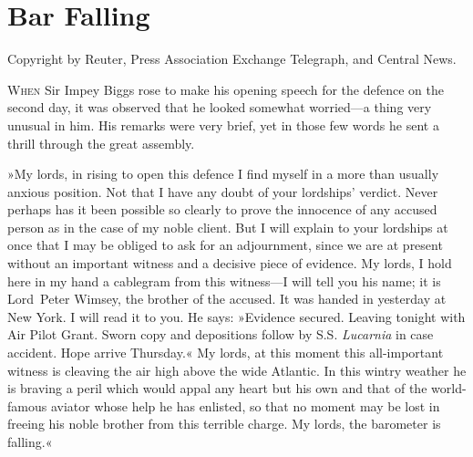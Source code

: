 
\chapter{Bar Falling}

\epigraph{Copyright by Reuter, Press Association Exchange Telegraph, and Central News.}{}


\lettrine[lines=4]{W}{hen} Sir Impey Biggs rose to make his opening speech for the defence on the second day, it was observed that he looked somewhat worried—a thing very unusual in him. His remarks were very brief, yet in those few words he sent a thrill through the great assembly.

»My lords, in rising to open this defence I find myself in a more than usually anxious position. Not that I have any doubt of your lordships' verdict. Never perhaps has it been possible so clearly to prove the innocence of any accused person as in the case of my noble client. But I will explain to your lordships at once that I may be obliged to ask for an adjournment, since we are at present without an important witness and a decisive piece of evidence. My lords, I hold here in my hand a cablegram from this witness—I will tell you his name; it is Lord~Peter Wimsey, the brother of the accused. It was handed in yesterday at New York. I will read it to you. He says: »Evidence secured. Leaving tonight with Air Pilot Grant. Sworn copy and depositions follow by S.S. \textit{Lucarnia} in case accident. Hope arrive Thursday.« My lords, at this moment this all-important witness is cleaving the air high above the wide Atlantic. In this wintry weather he is braving a peril which would appal any heart but his own and that of the world-famous aviator whose help he has enlisted, so that no moment may be lost in freeing his noble brother from this terrible charge. My lords, the barometer is falling.«


